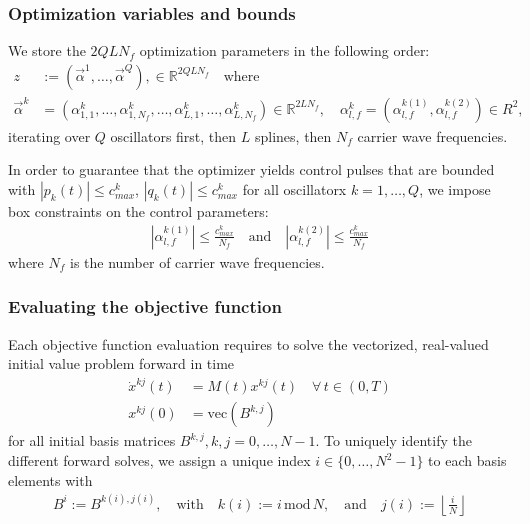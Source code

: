 \documentclass[letterpaper]{article}
\newcommand{\R}{\mathds{R}}
\begin{document}
  \subsubsection{Optimization variables and bounds}
  We store the $2QLN_f$ optimization parameters in the following order:
  \begin{align}
    z &:= \left( \vec{\alpha}^1, \dots, \vec{\alpha}^Q \right), \in \mathds{R}^{2QLN_f} \quad \text{where}\\
    \vec{\alpha}^k &= \left( \alpha_{1,1}^k,\dots, \alpha_{1,N_f}^k, \dots, \alpha_{L,1}^{k}, \dots, \alpha_{L,N_f}^k \right) \in \R^{2LN_f}, \quad \alpha_{l,f}^k = \left(\alpha_{l,f}^{k(1)}, \alpha_{l,f}^{k(2)} \right) \in R^2,
  \end{align}
  iterating over $Q$ oscillators first, then $L$ splines, then $N_f$ carrier wave frequencies. 

  In order to guarantee that the optimizer yields control pulses that are bounded with $|p_k(t)| \leq c^k_{max}$, $|q_k(t)| \leq c^k_{max}$ for all oscillatorx $k=1,\dots, Q$, we impose box constraints on the control parameters:
   \begin{align}
     | \alpha_{l,f}^{k(1)}| \leq \frac{c^k_{max}}{N_f} \quad \text{and} \quad | \alpha_{l,f}^{k(2)} | \leq \frac{c^k_{max}}{N_f}
   \end{align}
   where $N_f$ is the number of carrier wave frequencies.



  \subsubsection{Evaluating the objective function}
    Each objective function evaluation requires to solve the vectorized, real-valued initial value problem forward in time
    \begin{align*}
      \dot x^{kj}(t) &= M(t) x^{kj}(t) \quad \forall \, t\in (0,T) \\
      x^{kj}(0) &= \mbox{vec}(B^{k,j})
    \end{align*}
    for all initial basis matrices $B^{k,j}, k,j=0,\dots,N-1$. To uniquely identify the different forward solves, we assign a unique index $i \in \{0,\dots, N^2-1\}$ to each basis elements with 
    \begin{align*}
      B^i := B^{k(i), j(i)}, \quad \text{with} \quad k(i) := i \,\mbox{mod}\, N, \quad \text{and} \quad j(i) := \left\lfloor \frac{i}{N} \right\rfloor
    \end{align*}
\end{document}
